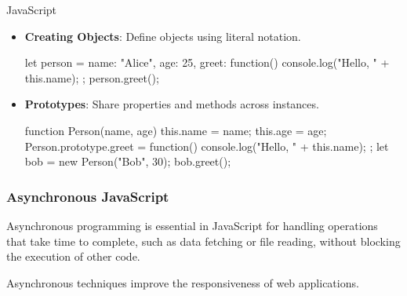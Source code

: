 \begin{notes}{JavaScript}
\begin{highlight}
        \begin{itemize}
            \item \textbf{Creating Objects}: Define objects using literal notation.
    \begin{code}[JavaScript]
    let person = {
        name: "Alice",
        age: 25,
        greet: function() {
            console.log("Hello, " + this.name);
        }
    };
    person.greet();
    \end{code}
            \item \textbf{Prototypes}: Share properties and methods across instances.
    \begin{code}[JavaScript]
    function Person(name, age) {
        this.name = name;
        this.age = age;
    }
    Person.prototype.greet = function() {
        console.log("Hello, " + this.name);
    };
    let bob = new Person("Bob", 30);
    bob.greet();
    \end{code}
        \end{itemize}
    
    \end{highlight}
    
    \subsubsection*{Asynchronous JavaScript}
    
    Asynchronous programming is essential in JavaScript for handling operations that take time to complete, such as data fetching or file reading, without blocking the execution of other code.
    
    \begin{highlight}
    
        Asynchronous techniques improve the responsiveness of web applications.
        

\end{highlight}
\end{notes}
